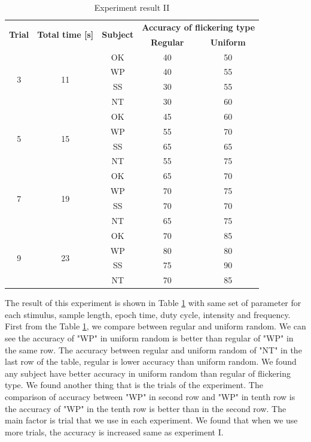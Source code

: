 \begin{table}[ht]
\centering
\begin{tabular}{| c | c | c | c | c |}

			\hline 
			\multirow{2}{*}{\textbf{Trial}} & 
  			\multirow{2}{*}{\textbf{Total time [s]}}  & 
            \multirow{2}{*}{\textbf{Subject}} &
            \multicolumn{2}{c|}{\textbf{Accuracy of flickering type}} \\
            \cline{4-5}
            &&&\multicolumn{1}{c|}{\textbf{Regular}} &\multicolumn{1}{c|}{\textbf{Uniform}}  \\
			\hline 
			\multirow{4}{*}{3}&\multirow{4}{*}{11}&OK&40&50 \\
			\cline{3-5}
			&&WP&40&55 \\ \cline{3-5}
			&&SS&30&55 \\ \cline{3-5}
			&&NT&30&60 \\
            \hline
			\multirow{4}{*}{5}&\multirow{4}{*}{15}&OK&45&60 \\
			\cline{3-5}
			&&WP&55&70 \\ \cline{3-5}
			&&SS&65&65 \\ \cline{3-5}
			&&NT&55&75 \\
            \hline
            \multirow{4}{*}{7}&\multirow{4}{*}{19}&OK&65&70 \\
			\cline{3-5}
			&&WP&70&75 \\ \cline{3-5}
			&&SS&70&70 \\ \cline{3-5}
			&&NT&65&75 \\
            \hline 
            \multirow{4}{*}{9}&\multirow{4}{*}{23}&OK&70&85 \\
			\cline{3-5}
			&&WP&80&80 \\ \cline{3-5}
			&&SS&75&90 \\ \cline{3-5}
			&&NT&70&85 \\
            \hline 
		\end{tabular}       
\caption{Experiment result II}
\label{table:result2}
\end{table}

The result of this experiment is shown in Table \ref{table:result2} with same set of parameter for each stimulus, sample length, epoch time, duty cycle, intensity and frequency. First from the Table \ref{table:result2}, we compare between regular and uniform random. We can see the accuracy of "WP" in uniform random is better than regular of "WP" in the same row. The accuracy between regular and uniform random of "NT" in the last row of the table, regular is lower accuracy than uniform random. We found any subject have better accuracy in uniform random than regular of flickering type. We found another thing that is the trials of the experiment. The comparison of accuracy between "WP" in second row and "WP" in tenth row is the accuracy of "WP" in the tenth row is better than in the second row. The main factor is trial that we use in each experiment. We found that when we use more trials, the accuracy is increased same as experiment I.